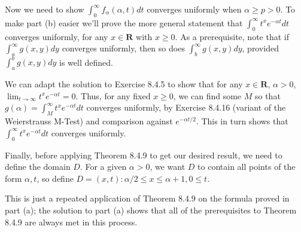 \begin{solution}
{Now we need to show \(\int_0^\infty f_\alpha(\alpha, t) dt\) converges uniformly when \(\alpha \geq p > 0\). To make part (b) easier we'll prove the more general statement that \(\int_0^\infty t^x e^{-\alpha t} dt\) converges uniformly, for any \(x \in \mathbf{R}\) with \(x \geq 0\). As a prerequisite, note that if \(\int_a^\infty g(x, y) dy\) converges uniformly, then so does \(\int_b^\infty g(x,y) dy\), provided \(\int_a^b g(x,y) dy\) is well defined.

We can adapt the solution to Exercise 8.4.5 to show that for any \(x \in \mathbf{R}\), \(\alpha > 0\), \(\lim_{t \to \infty} t^x e^{-\alpha t} = 0\). Thus, for any fixed \(x \geq 0\), we can find some \(M\) so that
\(g(\alpha) = \int_M^\infty t^x e^{-\alpha t} dt\)
converges uniformly, by Exercise 8.4.16 (variant of the Weierstrauss M-Test) and comparison against \(e^{-\alpha t /2}\). This in turn shows that \(\int_0^\infty t^x e^{-\alpha t} dt\) converges uniformly.

Finally, before applying Theorem 8.4.9 to get our desired result, we need to define the domain \(D\). For a given \(\alpha > 0\), we want \(D\) to contain all points of the form \(\alpha, t\), so define \(D = {(x,t): \alpha / 2 \leq x \leq \alpha + 1, 0 \leq t}\).

\item This is just a repeated application of Theorem 8.4.9 on the formula proved in part (a); the solution to part (a) shows that all of the prerequisites to Theorem 8.4.9 are always met in this process.
}
\end{solution}

